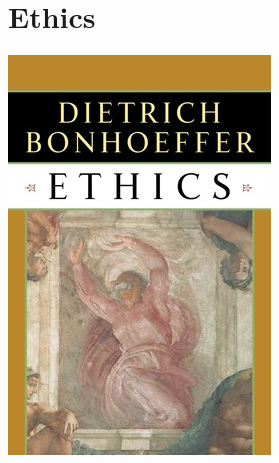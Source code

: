 \documentclass{tufte-handout}
\makeatletter
\newcommand{\varcaption}[2][0pt]{%
  \gsetlength{\@tufte@caption@vertical@offset}{-#1}%
  \gdef\@tufte@stored@varcaption{#2}%
}
\gdef\@tufte@stored@varcaption{} %
\makeatother
\begin{document}
\section*{Ethics}
\begin{marginfigure}[13\baselineskip]
   \includegraphics[width=\linewidth]{images/ethics.jpg}
   \varcaption{\href{https://www.harpercollins.com/9780060652951/the-great-divorce/}{Publisher Link}, \href{https://www.amazon.com/Great-Divorce-C-S-Lewis/dp/0060652950/}{Amazon Link}}
\end{marginfigure}
\end{document}

